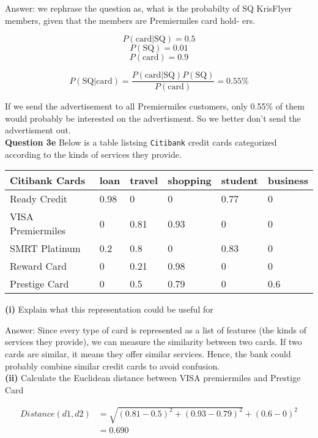 \documentclass[11pt,a4paper]{report}
\begin{document}
\begin{multicols*}{2}
\noindent Answer: we rephrase the question as, what is the probabilty of SQ KrisFlyer members, given that the members are Premiermiles card hold- ers.

$$P(\text{card} | \text{SQ}) = 0.5$$
$$P(\text{SQ}) = 0.01$$
$$P(\text{card}) = 0.9$$

$$P(\text{SQ} | \text{card}) = \frac{P(\text{card} | \text{SQ}) P(\text{SQ})}{P(\text{card})} = 0.55\%$$

\noindent If we send the advertisement to all Premiermiles customers, only 0.55\% of them would probably be interested on the advertisment. So we better don't send the advertisment out. \\

\noindent \textbf{Question 3e} Below is a table listsing \verb|Citibank| credit cards categorized according to the kinds of services they provide.

\tiny
\begin{center}
\begin{tabular}{|l | l | l | l | l | l |}
    \hline
    Citibank Cards & loan & travel & shopping & student & business \\
    \hline
    Ready Credit   & 0.98 & 0      & 0        & 0.77    & 0 \\
    VISA Premiermiles & 0 & 0.81   & 0.93     & 0       & 0 \\
    SMRT Platinum  & 0.2  & 0.8    & 0        & 0.83    & 0 \\
    Reward Card    & 0    & 0.21   & 0.98     & 0       & 0 \\
    Prestige Card  & 0    & 0.5    & 0.79     & 0       & 0.6\\
    \hline
\end{tabular}
\end{center}
\normalsize

\noindent \textbf{(i)} Explain what this representation could be useful for

\noindent Answer: Since every type of card is represented as a list of features (the kinds of services they provide), we can measure the similarity between two cards. If two cards are similar, it means they offer similar services. Hence, the bank could probably combine similar credit cards to avoid confusion. \\

\noindent \textbf{(ii)} Calculate the Euclidean distance between VISA premiermiles and Prestige Card

\begin{equation*}
\begin{split}
    Distance(d1,d2) &= \sqrt{(0.81 - 0.5)^2 + (0.93 - 0.79)^2} + (0.6 - 0)^2\\
    &= 0.690
\end{split}
\end{equation*}


\end{multicols*}
\end{document}

